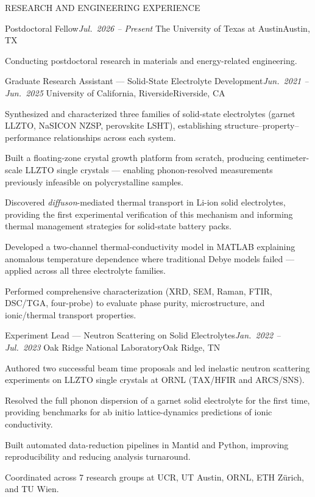 \documentclass{resume}
\begin{document}
\begin{rSection}{RESEARCH AND ENGINEERING EXPERIENCE}

\begin{rSubsection}
    {Postdoctoral Fellow}{\em Jul.\ 2026 -- Present}
    {The University of Texas at Austin}{Austin, TX}
\item Conducting postdoctoral research in materials and energy-related engineering.
\end{rSubsection}

\begin{rSubsection}
    {Graduate Research Assistant --- Solid-State Electrolyte Development}{\em Jun.\ 2021 -- Jun.\ 2025}
    {University of California, Riverside}{Riverside, CA}
\item Synthesized and characterized three families of solid-state electrolytes (garnet LLZTO, NaSICON NZSP, perovskite LSHT), establishing structure--property--performance relationships across each system.
\item Built a floating-zone crystal growth platform from scratch, producing centimeter-scale LLZTO single crystals --- enabling phonon-resolved measurements previously infeasible on polycrystalline samples.
\item Discovered \textit{diffuson}-mediated thermal transport in Li-ion solid electrolytes, providing the first experimental verification of this mechanism and informing thermal management strategies for solid-state battery packs.
\item Developed a two-channel thermal-conductivity model in MATLAB explaining anomalous temperature dependence where traditional Debye models failed --- applied across all three electrolyte families.
\item Performed comprehensive characterization (XRD, SEM, Raman, FTIR, DSC/TGA, four-probe) to evaluate phase purity, microstructure, and ionic/thermal transport properties.
\end{rSubsection}

\begin{rSubsection}
    {Experiment Lead --- Neutron Scattering on Solid Electrolytes}{\em Jan.\ 2022 -- Jul.\ 2023}
    {Oak Ridge National Laboratory}{Oak Ridge, TN}
\item Authored two successful beam time proposals and led inelastic neutron scattering experiments on LLZTO single crystals at ORNL (TAX/HFIR and ARCS/SNS).
\item Resolved the full phonon dispersion of a garnet solid electrolyte for the first time, providing benchmarks for ab initio lattice-dynamics predictions of ionic conductivity.
\item Built automated data-reduction pipelines in Mantid and Python, improving reproducibility and reducing analysis turnaround.
\item Coordinated across 7 research groups at UCR, UT Austin, ORNL, ETH Z\"{u}rich, and TU Wien.
\end{rSubsection}


\end{rSection}
\end{document}
